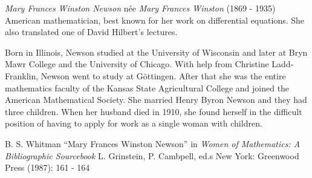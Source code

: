 \documentclass[12pt]{article}
\begin{document}

\emph{Mary Frances Winston Newson} n\'ee \emph{Mary Frances Winston} (1869 - 1935) American mathematician, best known for her work on differential equations. She also translated one of David Hilbert's lectures.

Born in Illinois, Newson studied at the University of Wisconsin and later at Bryn Mawr College and the University of Chicago. With help from Christine Ladd-Franklin, Newson went to study at G\"ottingen. After that she was the entire mathematics faculty of the Kansas State Agricultural College and joined the American Mathematical Society. She married Henry Byron Newson and they had three children. When her husband died in 1910, she found herself in the difficult position of having to apply for work as a single woman with children.

\begin{thebibliography}{5}
 B. S. Whitman ``Mary Frances Winston Newson'' in {\it Women of Mathematics: A Bibliographic Sourcebook} L. Grinstein, P. Cambpell, ed.s New York: Greenwood Press (1987): 161 - 164
\end{thebibliography}
\end{document}

